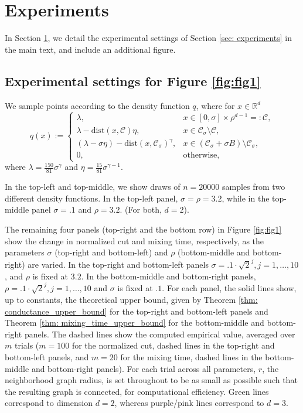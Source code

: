 \documentclass[11pt,twoside]{article}
\newcommand{\Reals}{\mathbb{R}}
\newcommand{\Rd}{\Reals^d}
\newcommand{\1}{\mathbf{1}}
\newcommand{\dist}{\mathrm{dist}}
\newcommand{\Cset}{\mathcal{C}}
\newcommand{\Csig}{\Cset_{\sigma}}
\begin{document}
\section{Experiments}
\label{sec: experimental_setting}

In Section \ref{sec: experimental_setting}, we detail the experimental settings of Section \ref{sec: experiments} in the main text, and include an additional figure. 

\subsection{Experimental settings for Figure \ref{fig:fig1}}
We sample points according to the density function $q$, where for $x \in \Rd$
\begin{equation}
q(x) :=
\begin{cases}
\lambda,~ & x \in [0,\sigma] \times \rho^{d-1} =: \Cset, \\
\lambda - \dist(x,\Cset)\eta,~ & x \in \Csig \setminus \Cset, \\
(\lambda - \sigma \eta) - \dist(x,\Csig)^{\gamma}, & x \in (\Csig + \sigma B) \setminus \Csig, \\
0,~ & \textrm{otherwise},
\end{cases}
\end{equation}
where $\lambda = \frac{150}{81} \sigma^{\gamma}$ and $\eta = \frac{15}{81} \sigma^{\gamma - 1}$.

In the top-left and top-middle, we show draws of $n = 20000$ samples from two different density functions. In the top-left panel, $\sigma = \rho = 3.2$, while in the top-middle panel $\sigma = .1$ and $\rho = 3.2$. (For both, $d = 2$).

The remaining four panels (top-right and the bottom row) in Figure \ref{fig:fig1} show the change in normalized cut and mixing time, respectively, as the parameters $\sigma$ (top-right and bottom-left) and $\rho$ (bottom-middle and bottom-right) are varied. In the top-right and bottom-left panels $\sigma = .1 \cdot \sqrt{2}^j, j = 1,\ldots,10$, and $\rho$ is fixed at $3.2$. In the bottom-middle and bottom-right panels, $\rho = .1 \cdot \sqrt{2}^j, j = 1,\ldots,10$ and $\sigma$ is fixed at $.1$.
For each panel, the solid lines show, up to constants, the theoretical upper bound, given by Theorem \ref{thm: conductance_upper_bound} for the top-right and bottom-left panels and Theorem \ref{thm: mixing_time_upper_bound} for the bottom-middle and bottom-right panels. The dashed lines show the computed empirical value, averaged over $m$ trials ($m = 100$ for the normalized cut, dashed lines in the top-right and bottom-left panels, and $m = 20$ for the mixing time, dashed lines in the bottom-middle and bottom-right panels). For each trial across all parameters, $r$, the neighborhood graph radius, is set throughout to be as small as possible such that the resulting graph is connected, for computational efficiency. Green lines correspond to dimension $d = 2$, whereas purple/pink lines correspond to $d = 3$. 
\end{document}
